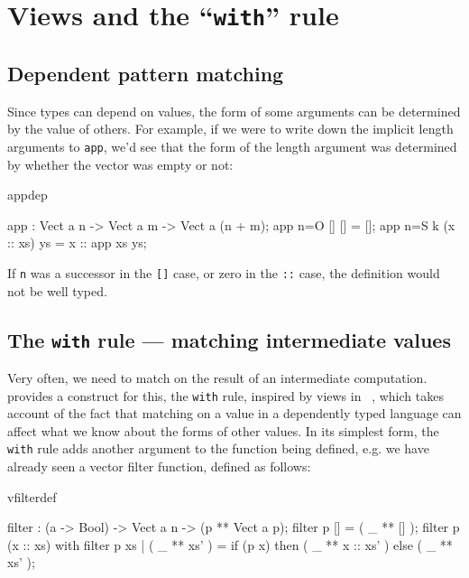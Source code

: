 \section{Views and the ``\texttt{with}'' rule}

\subsection{Dependent pattern matching}

Since types can depend on values, the form of some arguments can be determined
by the value of others. For example, if we were to write down the implicit
length arguments to \texttt{app}, we'd see that the form of the length argument was
determined by whether the vector was empty or not:

\begin{SaveVerbatim}{appdep}

app : Vect a n -> Vect a m -> Vect a (n + m);
app {n=O}   []        [] = [];
app {n=S k} (x :: xs) ys = x :: app xs ys;

\end{SaveVerbatim}

\noindent
If \texttt{n} was a successor in the \texttt{[]} case, or zero in the 
\texttt{::} case, the definition
would not be well typed.

\subsection{The \texttt{with} rule --- matching intermediate values}

Very often, we need to match on the result of an intermediate computation.
\Idris{} provides a construct for this, the \texttt{with} rule, 
inspired by views in \Epigram~\cite{view-left},
which takes account of the
fact that matching on a value in a dependently typed language can affect what
we know about the forms of other values. In its simplest form, the \texttt{with} rule
adds another argument to the function being defined, e.g. we have already seen
a vector filter function, defined as follows:

\begin{SaveVerbatim}{vfilterdef}

filter : (a -> Bool) -> Vect a n -> (p ** Vect a p);
filter p [] = ( _ ** [] );
filter p (x :: xs) with filter p xs {
  | ( _ ** xs' ) 
     = if (p x) then ( _ ** x :: xs' ) else ( _ ** xs' );
}

\end{SaveVerbatim}

